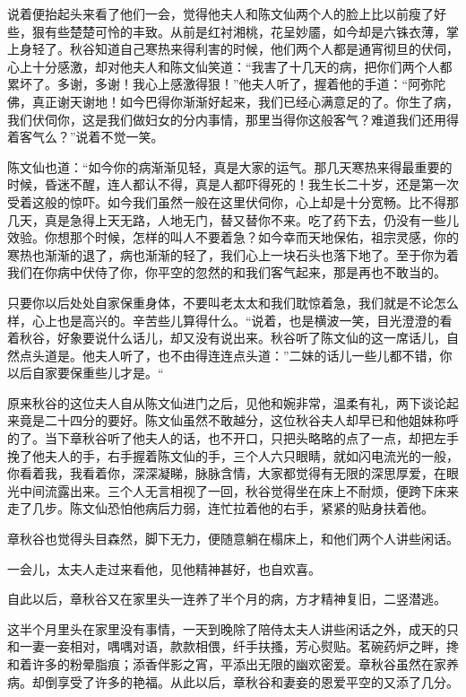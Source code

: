 \documentclass[12pt,UTF8]{ctexbook}
\begin{document}
{{{说着便抬起头来看了他们一会，觉得他夫人和陈文仙两个人的脸上比以前瘦了好些，狠有些楚楚可怜的丰致。从前是红衬湘桃，花呈妙靥，如今却是六铢衣薄，掌上身轻了。秋谷知道自己寒热来得利害的时候，他们两个人都是通宵彻旦的伏伺，心上十分感激，却对他夫人和陈文仙笑道：“我害了十几天的病，把你们两个人都累坏了。多谢，多谢！我心上感激得狠！”他夫人听了，握着他的手道：“阿弥陀佛，真正谢天谢地！如今巴得你渐渐好起来，我们已经心满意足的了。你生了病，我们伏伺你，这是我们做妇女的分内事情，那里当得你这般客气？难道我们还用得着客气么？”说着不觉一笑。

陈文仙也道：“如今你的病渐渐见轻，真是大家的运气。那几天寒热来得最重要的时候，昏迷不醒，连人都认不得，真是人都吓得死的！我生长二十岁，还是第一次受着这般的惊吓。如今我们虽然一般在这里伏伺你，心上却是十分宽畅。比不得那几天，真是急得上天无路，人地无门，替又替你不来。吃了药下去，仍没有一些儿效验。你想那个时候，怎样的叫人不要着急？如今幸而天地保佑，祖宗灵感，你的寒热也渐渐的退了，病也渐渐的轻了，我们心上一块石头也落下地了。至于你为着我们在你病中伏侍了你，你平空的忽然的和我们客气起来，那是再也不敢当的。

只要你以后处处自家保重身体，不要叫老太太和我们耽惊着急，我们就是不论怎么样，心上也是高兴的。辛苦些儿算得什么。“说着，也是横波一笑，目光澄澄的看着秋谷，好象要说什么话儿，却又没有说出来。秋谷听了陈文仙的这一席话儿，自然点头道是。他夫人听了，也不由得连连点头道：”二妹的话儿一些儿都不错，你以后自家要保重些儿才是。“

原来秋谷的这位夫人自从陈文仙进门之后，见他和婉非常，温柔有礼，两下谈论起来竟是二十四分的要好。陈文仙虽然不敢越分，这位秋谷夫人却早已和他姐妹称呼的了。当下章秋谷听了他夫人的话，也不开口，只把头略略的点了一点，却把左手挽了他夫人的手，右手握着陈文仙的手，三个人六只眼睛，就如闪电流光的一般，你看着我，我看着你，深深凝睇，脉脉含情，大家都觉得有无限的深思厚爱，在眼光中间流露出来。三个人无言相视了一回，秋谷觉得坐在床上不耐烦，便跨下床来走了几步。陈文仙恐怕他病后力弱，连忙拉着他的右手，紧紧的贴身扶着他。

章秋谷也觉得头目森然，脚下无力，便随意躺在榻床上，和他们两个人讲些闲话。

一会儿，太夫人走过来看他，见他精神甚好，也自欢喜。

自此以后，章秋谷又在家里头一连养了半个月的病，方才精神复旧，二竖潜逃。

这半个月里头在家里没有事情，一天到晚除了陪侍太夫人讲些闲话之外，成天的只和一妻一妾相对，喁喁对语，款款相偎，纤手扶搔，芳心熨贴。茗碗药炉之畔，搀和着许多的粉晕脂痕；添香伴影之宵，平添出无限的幽欢密爱。章秋谷虽然在家养病。却倒享受了许多的艳福。从此以后，章秋谷和妻妾的恩爱平空的又添了几分。

}}}
\end{document}
